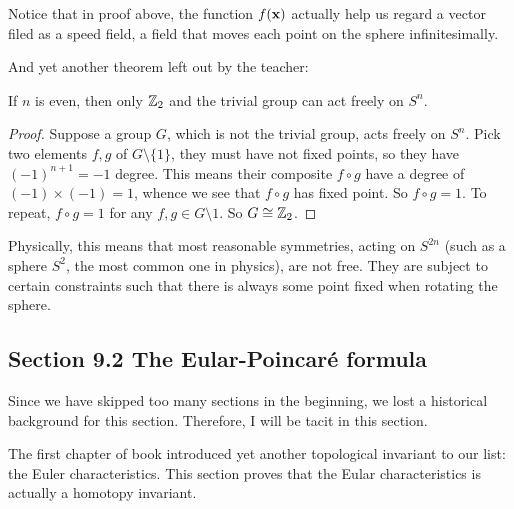 Notice that in proof above, the function $f(\vb{x})$ actually help us
regard a vector filed as a speed field, a field that moves each point
on the sphere infinitesimally.

And yet another theorem left out by the teacher:
\begin{thm}
    If $n$ is even, then only $\mathbb{Z}_2$ and the trivial group can act freely on
    $S^n$.
\end{thm}
\begin{proof}
    Suppose a group $G$, which is not the trivial group, acts freely on $S^n$.
    Pick two elements $f,g$ of $G\setminus\{1\}$, they must have not fixed
    points, so they have $(-1)^{n+1}=-1$ degree. This means their composite
    $f\circ g$ have a degree of $(-1)\times(-1)=1$, whence we see that $f\circ
    g$ has fixed point. So $f\circ g= 1$. To repeat, $f\circ g=1$ for any
    $f,g\in G\setminus{1}$. So $G\cong \mathbb{Z}_2$.
\end{proof}
\begin{remark}
    Physically, this means that most reasonable symmetries, acting on $S^{2n}$ (such
    as a sphere $S^2$, the most common one in physics), are not free. They are
    subject to certain constraints such that there is always some point fixed
    when rotating the sphere.
\end{remark}
\subsection{Section 9.2 The Eular-Poincar\'e formula}
\label{sec:The-Eular-Poincare-formula}

Since we have skipped too many sections in the beginning, we lost a historical
background for this section. Therefore, I will be tacit in this section.

The first chapter of book\cite{book} introduced yet another topological invariant
to our list: the Euler characteristics. This section proves that the Eular
characteristics is actually a homotopy invariant.

